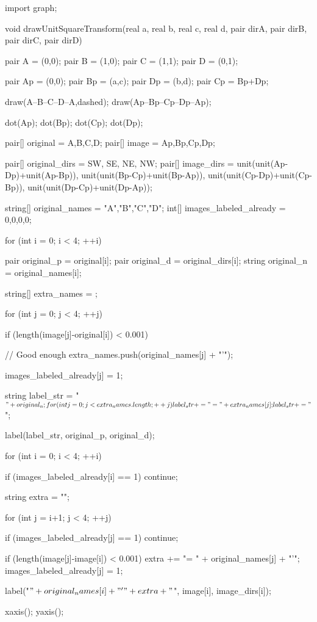 \documentclass[../key.tex]{subfiles}
\begin{document}
\begin{asydef}
import graph;

void drawUnitSquareTransform(real a, real b, real c, real d, pair dirA, pair dirB, pair dirC, pair dirD) {
	pair A = (0,0);
	pair B = (1,0);
	pair C = (1,1);
	pair D = (0,1);

	pair Ap = (0,0);
	pair Bp = (a,c);
	pair Dp = (b,d);
	pair Cp = Bp+Dp;

	draw(A--B--C--D--A,dashed);
	draw(Ap--Bp--Cp--Dp--Ap);

	dot(Ap);
	dot(Bp);
	dot(Cp);
	dot(Dp);

	pair[] original = {A,B,C,D};
	pair[] image = {Ap,Bp,Cp,Dp};

	pair[] original_dirs = {SW, SE, NE, NW};
	pair[] image_dirs = {unit(unit(Ap-Dp)+unit(Ap-Bp)),
	unit(unit(Bp-Cp)+unit(Bp-Ap)),
	unit(unit(Cp-Dp)+unit(Cp-Bp)),
	unit(unit(Dp-Cp)+unit(Dp-Ap))};

	string[] original_names = {"A","B","C","D"};
	int[] images_labeled_already = {0,0,0,0};

	for (int i = 0; i < 4; ++i) {
		pair original_p = original[i];
		pair original_d = original_dirs[i];
		string original_n = original_names[i];

		string[] extra_names = {};

		for (int j = 0; j < 4; ++j) {
			if (length(image[j]-original[i]) < 0.001) { // Good enough
				extra_names.push(original_names[j] + "'");

				images_labeled_already[j] = 1;
			}
		}

		string label_str = "$" + original_n;

		for (int j = 0; j < extra_names.length; ++j) {
			label_str += "=" + extra_names[j];
		}

		label_str += "$";

		label(label_str, original_p, original_d);
	}

	for (int i = 0; i < 4; ++i) {
		if (images_labeled_already[i] == 1) continue;

		string extra = "";

		for (int j = i+1; j < 4; ++j) {
			if (images_labeled_already[j] == 1) continue;

			if (length(image[j]-image[i]) < 0.001) {
				extra += "= " + original_names[j] + "'";
				images_labeled_already[j] = 1;
			}
		}

		label("$" + original_names[i] + "'" + extra + "$", image[i], image_dirs[i]);
	}

	xaxis();
	yaxis();
}
\end{asydef}
\end{document}
